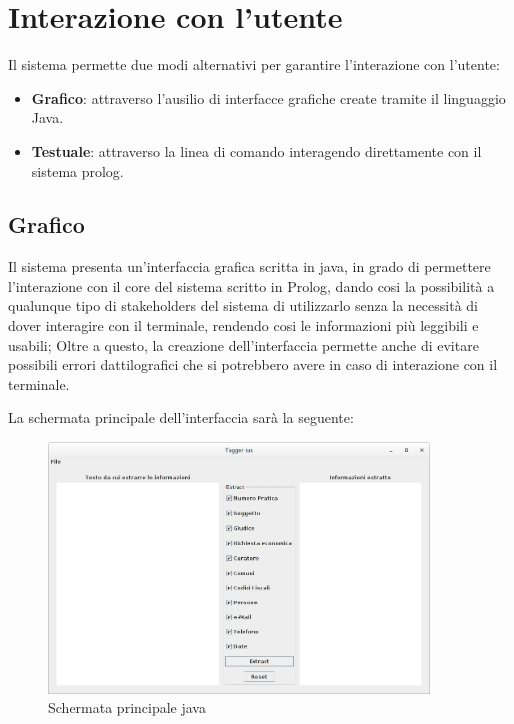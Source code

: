 \section{Interazione con l'utente}
Il sistema permette due modi alternativi per garantire l'interazione con l'utente:
\begin{itemize}
	\item \textbf{Grafico}: attraverso l'ausilio di interfacce grafiche create tramite il linguaggio Java.
	\item \textbf{Testuale}: attraverso la linea di comando interagendo direttamente con il sistema prolog.
\end{itemize}
\subsection{Grafico}
Il sistema presenta un'interfaccia grafica scritta in java, in grado di permettere l'interazione con il core del sistema scritto in Prolog, dando cosi la possibilità a qualunque tipo di stakeholders del sistema di utilizzarlo senza la necessità di dover interagire con il terminale, rendendo cosi le informazioni più leggibili e usabili; Oltre a questo, la creazione dell'interfaccia permette anche di evitare possibili errori dattilografici che si potrebbero avere in caso di interazione con il terminale.

La schermata principale dell'interfaccia sarà la seguente:
\begin{figure}[H]
	\centering
	\includegraphics[width=0.9\textwidth]{img/interfaces/java-main.png}
	\caption[Schermata java main]{Schermata principale java}
	\label{java-main}
\end{figure}

